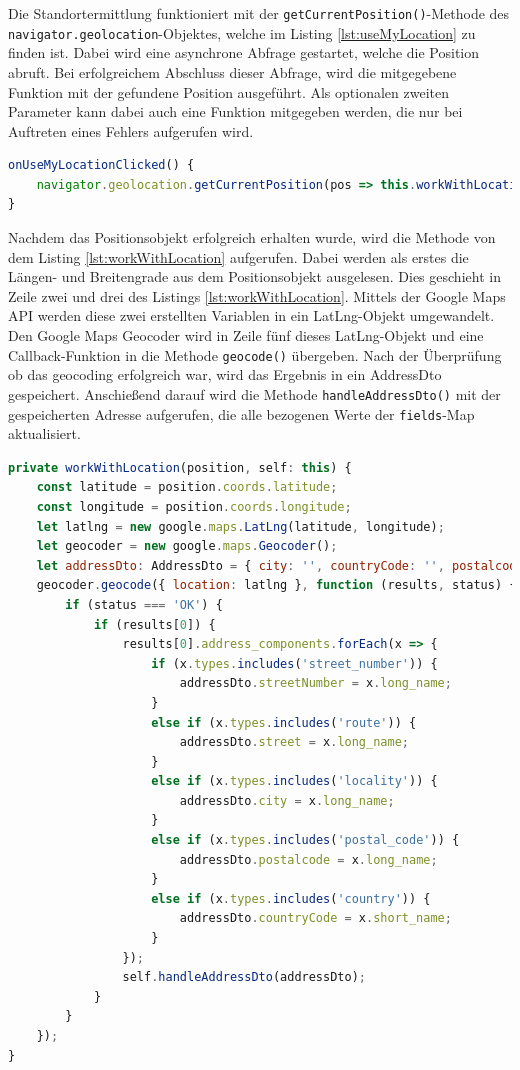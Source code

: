 Die Standortermittlung funktioniert mit der \texttt{getCurrentPosition()}-Methode des \texttt{navigator.geolocation}-Objektes, welche im Listing \ref{lst:useMyLocation} zu finden ist. Dabei wird eine asynchrone Abfrage gestartet, welche die Position abruft. Bei erfolgreichem Abschluss dieser Abfrage, wird die mitgegebene Funktion mit der gefundene Position ausgeführt. Als optionalen zweiten Parameter kann dabei auch eine Funktion mitgegeben werden, die nur bei Auftreten eines Fehlers aufgerufen wird. \autocite{useMyLocation}

\begin{lstlisting}[caption={Die \texttt{onUseMyLocationClicked()}-Methode der \texttt{StreetComponent}-Klasse}, language=JavaScript,label={lst:useMyLocation}]
onUseMyLocationClicked() {
	navigator.geolocation.getCurrentPosition(pos => this.workWithLocation(pos, this));
}
\end{lstlisting}

Nachdem das Positionsobjekt erfolgreich erhalten wurde, wird die Methode von dem Listing \ref{lst:workWithLocation} aufgerufen. Dabei werden als erstes die Längen- und Breitengrade aus dem Positionsobjekt ausgelesen. Dies geschieht in Zeile zwei und drei des Listings \ref{lst:workWithLocation}. Mittels der Google Maps API werden diese zwei erstellten Variablen in ein LatLng-Objekt umgewandelt.\autocite{latLngObjekt} Den Google Maps Geocoder wird in Zeile fünf dieses LatLng-Objekt und eine Callback-Funktion in die Methode \texttt{geocode()} übergeben. Nach der Überprüfung ob das geocoding erfolgreich war, wird das Ergebnis in ein AddressDto gespeichert. Anschießend darauf wird die Methode \texttt{handleAddressDto()} mit der gespeicherten Adresse aufgerufen, die alle bezogenen Werte der \texttt{fields}-Map aktualisiert.

\begin{lstlisting}[caption={Die \texttt{workWithLocation()}-Methode der \texttt{StreetComponent}-Klasse}, language=JavaScript,label={lst:workWithLocation}]
private workWithLocation(position, self: this) {
	const latitude = position.coords.latitude;
	const longitude = position.coords.longitude;
	let latlng = new google.maps.LatLng(latitude, longitude);
	let geocoder = new google.maps.Geocoder();
	let addressDto: AddressDto = { city: '', countryCode: '', postalcode: '', street: '', streetNumber: '' };
	geocoder.geocode({ location: latlng }, function (results, status) {
		if (status === 'OK') {
			if (results[0]) {
				results[0].address_components.forEach(x => {
					if (x.types.includes('street_number')) {
						addressDto.streetNumber = x.long_name;
					}
					else if (x.types.includes('route')) {
						addressDto.street = x.long_name;
					}
					else if (x.types.includes('locality')) {
						addressDto.city = x.long_name;
					}
					else if (x.types.includes('postal_code')) {
						addressDto.postalcode = x.long_name;
					}
					else if (x.types.includes('country')) {
						addressDto.countryCode = x.short_name;
					}
				});
				self.handleAddressDto(addressDto);
			}
		}
	});
}
\end{lstlisting}

